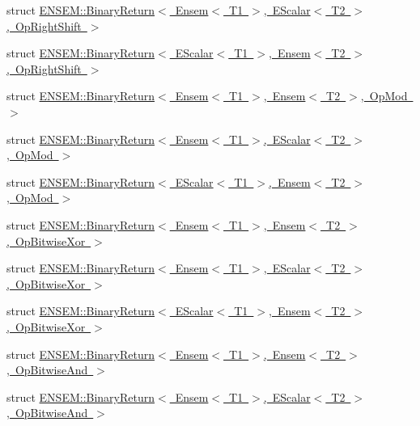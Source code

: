 \begin{DoxyCompactItemize}
struct \mbox{\hyperlink{structENSEM_1_1BinaryReturn_3_01Ensem_3_01T1_01_4_00_01EScalar_3_01T2_01_4_00_01OpRightShift_01_4}{E\+N\+S\+E\+M\+::\+Binary\+Return$<$ Ensem$<$ T1 $>$, E\+Scalar$<$ T2 $>$, Op\+Right\+Shift $>$}}
\item 
struct \mbox{\hyperlink{structENSEM_1_1BinaryReturn_3_01EScalar_3_01T1_01_4_00_01Ensem_3_01T2_01_4_00_01OpRightShift_01_4}{E\+N\+S\+E\+M\+::\+Binary\+Return$<$ E\+Scalar$<$ T1 $>$, Ensem$<$ T2 $>$, Op\+Right\+Shift $>$}}
\item 
struct \mbox{\hyperlink{structENSEM_1_1BinaryReturn_3_01Ensem_3_01T1_01_4_00_01Ensem_3_01T2_01_4_00_01OpMod_01_4}{E\+N\+S\+E\+M\+::\+Binary\+Return$<$ Ensem$<$ T1 $>$, Ensem$<$ T2 $>$, Op\+Mod $>$}}
\item 
struct \mbox{\hyperlink{structENSEM_1_1BinaryReturn_3_01Ensem_3_01T1_01_4_00_01EScalar_3_01T2_01_4_00_01OpMod_01_4}{E\+N\+S\+E\+M\+::\+Binary\+Return$<$ Ensem$<$ T1 $>$, E\+Scalar$<$ T2 $>$, Op\+Mod $>$}}
\item 
struct \mbox{\hyperlink{structENSEM_1_1BinaryReturn_3_01EScalar_3_01T1_01_4_00_01Ensem_3_01T2_01_4_00_01OpMod_01_4}{E\+N\+S\+E\+M\+::\+Binary\+Return$<$ E\+Scalar$<$ T1 $>$, Ensem$<$ T2 $>$, Op\+Mod $>$}}
\item 
struct \mbox{\hyperlink{structENSEM_1_1BinaryReturn_3_01Ensem_3_01T1_01_4_00_01Ensem_3_01T2_01_4_00_01OpBitwiseXor_01_4}{E\+N\+S\+E\+M\+::\+Binary\+Return$<$ Ensem$<$ T1 $>$, Ensem$<$ T2 $>$, Op\+Bitwise\+Xor $>$}}
\item 
struct \mbox{\hyperlink{structENSEM_1_1BinaryReturn_3_01Ensem_3_01T1_01_4_00_01EScalar_3_01T2_01_4_00_01OpBitwiseXor_01_4}{E\+N\+S\+E\+M\+::\+Binary\+Return$<$ Ensem$<$ T1 $>$, E\+Scalar$<$ T2 $>$, Op\+Bitwise\+Xor $>$}}
\item 
struct \mbox{\hyperlink{structENSEM_1_1BinaryReturn_3_01EScalar_3_01T1_01_4_00_01Ensem_3_01T2_01_4_00_01OpBitwiseXor_01_4}{E\+N\+S\+E\+M\+::\+Binary\+Return$<$ E\+Scalar$<$ T1 $>$, Ensem$<$ T2 $>$, Op\+Bitwise\+Xor $>$}}
\item 
struct \mbox{\hyperlink{structENSEM_1_1BinaryReturn_3_01Ensem_3_01T1_01_4_00_01Ensem_3_01T2_01_4_00_01OpBitwiseAnd_01_4}{E\+N\+S\+E\+M\+::\+Binary\+Return$<$ Ensem$<$ T1 $>$, Ensem$<$ T2 $>$, Op\+Bitwise\+And $>$}}
\item 
struct \mbox{\hyperlink{structENSEM_1_1BinaryReturn_3_01Ensem_3_01T1_01_4_00_01EScalar_3_01T2_01_4_00_01OpBitwiseAnd_01_4}{E\+N\+S\+E\+M\+::\+Binary\+Return$<$ Ensem$<$ T1 $>$, E\+Scalar$<$ T2 $>$, Op\+Bitwise\+And $>$}}
\item 

\end{DoxyCompactItemize}
